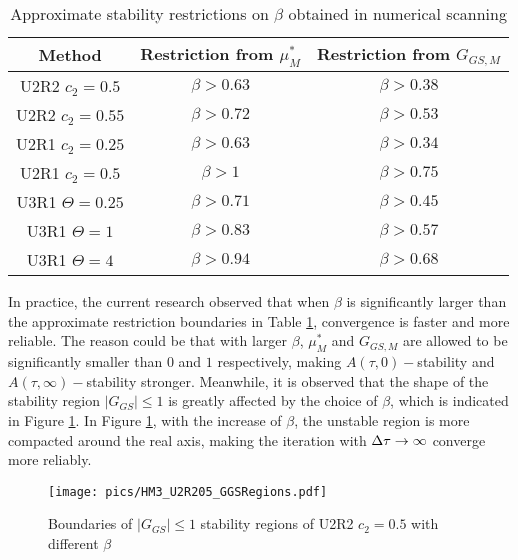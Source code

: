 \documentclass[preprint,12pt]{elsarticle}
\begin{document}
\begin{table}[htbp]
    \centering
    \begin{tabular}{|c|c|c|}
        \hline
        Method             & Restriction from $\mu^*_{M}$ & Restriction from $G_{GS,M}$ \\
        \hline
        U2R2 $c_2=0.5$     & $\beta > 0.63$               & $\beta > 0.38$              \\
        \hline
        U2R2 $c_2=0.55$    & $\beta > 0.72$               & $\beta > 0.53$              \\
        \hline
        U2R1 $c_2=0.25$    & $\beta > 0.63$               & $\beta > 0.34$              \\
        \hline
        U2R1 $c_2=0.5$     & $\beta > 1$                  & $\beta > 0.75$              \\
        \hline
        U3R1 $\Theta=0.25$ & $\beta > 0.71$               & $\beta > 0.45$              \\
        \hline
        U3R1 $\Theta=1$    & $\beta > 0.83$               & $\beta > 0.57$              \\
        \hline
        U3R1 $\Theta=4$    & $\beta > 0.94$               & $\beta > 0.68$              \\
        \hline
    \end{tabular}
    \caption{Approximate stability restrictions on $\beta$ obtained in numerical scanning}
    \label{tab:resrictionBetaSearch}
\end{table}

In practice, the current research observed that
when $\beta$ is significantly larger than the approximate
restriction boundaries in Table \ref{tab:resrictionBetaSearch},
convergence is faster and more reliable.
The reason could be that with larger $\beta$, $\mu^*_M$  and $G_{GS,M}$
are allowed to be significantly smaller than $0$ and $1$ respectively,
making $A(\tau,0)-$stability and
$A(\tau,\infty)-$stability stronger.
Meanwhile, it is observed that the shape of the stability region
$|G_{GS}|\leq1$ is greatly affected by the choice of $\beta$,
which is indicated in Figure \ref{fig:HM3_U2R205_GGSRegions}.
In Figure \ref{fig:HM3_U2R205_GGSRegions}, with the
increase of $\beta$, the unstable region is more
compacted around the real axis, making the iteration with $\mathrm\Delta\tau\rightarrow\infty$
converge more reliably.
\begin{figure}[htbp]
    \centering
    \texttt{[image: pics/HM3\_U2R205\_GGSRegions.pdf]}
    \caption[]{Boundaries of $|G_{GS}|\leq1$ stability regions of U2R2 $c_2=0.5$ with different $\beta$}
    \label{fig:HM3_U2R205_GGSRegions}
\end{figure}
\end{document}
